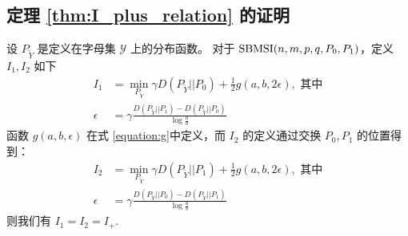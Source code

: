 \subsection{定理 \ref{thm:I_plus_relation} 的证明}
	\begin{lemma}\label{lem:p0p12}
        设 $P_{\widetilde{Y}}$ 是定义在字母集
        $\mathcal{Y}$ 上的分布函数。
		对于 $\operatorname{SBMSI}(n,m,p,q,P_0,P_1)$，定义
        $I_1, I_2$ 如下
		\begin{align}
			I_1 &=\min_{P_{\widetilde{Y}}} \gamma D(P_{\widetilde{Y}}|| P_0)+ \frac{1}{2} g(a,b, 2\epsilon),
            \text{ 其中}\nonumber\\
			\epsilon &= \gamma \frac{D(P_{\widetilde{Y}} || P_1) - D(P_{\widetilde{Y}} || P_0) }{\log \frac{a}{b}}\label{eq:I1}
		\end{align}
        函数 $g(a,b,\epsilon)$ 在式 \eqref{equation:g}中定义，而 $I_2$ 的定义通过交换 $P_0, P_1$ 的位置得到：
		\begin{align}
			I_2 & = \min_{P_{\widetilde{Y}}} \gamma D(P_{\widetilde{Y}}|| P_1)+ \frac{1}{2} g(a,b, 2\epsilon),
            \text{ 其中}\nonumber\\
			\epsilon &= \gamma \frac{D(P_{\widetilde{Y}} || P_0) - D(P_{\widetilde{Y}} || P_1) }{\log \frac{a}{b}}
            \label{eq:I2}
		\end{align}
 		则我们有 $I_1=I_2=I_+$. 
    \end{lemma}
